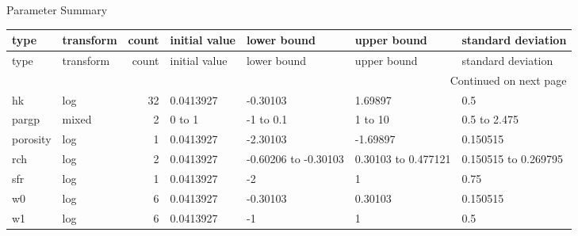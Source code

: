 \documentclass{article}
\begin{document}
\begin{center}
Parameter Summary
\end{center}
\begin{center}
\begin{landscape}
\begin{longtable}{llrllll}
\toprule
    type & transform &  count &  initial value &          lower bound &         upper bound &   standard deviation \\
\midrule
\endfirsthead

\toprule
    type & transform &  count &  initial value &          lower bound &         upper bound &   standard deviation \\
\midrule
\endhead
\midrule
\multicolumn{7}{r}{{Continued on next page}} \\
\midrule
\endfoot

\bottomrule
\endlastfoot
      hk &       log &     32 &      0.0413927 &             -0.30103 &             1.69897 &                  0.5 \\
   pargp &     mixed &      2 &     0 to     1 &          -1 to   0.1 &          1 to    10 &         0.5 to 2.475 \\
porosity &       log &      1 &      0.0413927 &             -2.30103 &            -1.69897 &             0.150515 \\
     rch &       log &      2 &      0.0413927 & -0.60206 to -0.30103 & 0.30103 to 0.477121 & 0.150515 to 0.269795 \\
     sfr &       log &      1 &      0.0413927 &                   -2 &                   1 &                 0.75 \\
      w0 &       log &      6 &      0.0413927 &             -0.30103 &             0.30103 &             0.150515 \\
      w1 &       log &      6 &      0.0413927 &                   -1 &                   1 &                  0.5 \\
\end{longtable}
\end{landscape}
\end{center}
\end{document}
